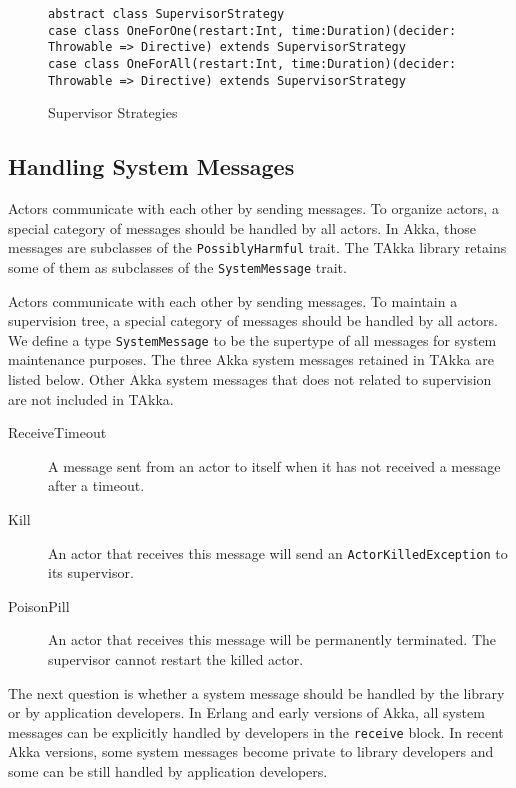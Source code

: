 \begin{figure}
\label{super}
    \begin{lstlisting}    
abstract class SupervisorStrategy
case class OneForOne(restart:Int, time:Duration)(decider: Throwable => Directive) extends SupervisorStrategy
case class OneForAll(restart:Int, time:Duration)(decider: Throwable => Directive) extends SupervisorStrategy
    \end{lstlisting}
    \caption{Supervisor Strategies}
\end{figure}


\subsection{Handling System Messages}
\label{systemmessage}
Actors communicate with each other by sending messages.  To organize actors, a 
special category of messages should be handled by all actors.  In Akka, those 
messages are subclasses of the {\tt PossiblyHarmful} trait.  The TAkka library 
retains some of them as subclasses of the {\tt SystemMessage} trait.

Actors communicate with each other by sending messages.  To maintain a
supervision tree, a special category of messages should be handled by all 
actors.  We define a type {\tt SystemMessage} to be the supertype of all 
messages for system maintenance purposes.  The three Akka system messages 
retained in TAkka are listed below.  Other Akka system messages that does not 
related to supervision are not included in TAkka.


\begin{description}
  \item[ReceiveTimeout] A message sent from an actor to itself when it has not received a message
after a timeout.
  \item[Kill] An actor that receives this message will send an {\tt ActorKilledException} to its supervisor.
  \item[PoisonPill] An actor that receives this message will be 
permanently terminated.  The supervisor cannot restart the killed actor.
\end{description}


The next question is whether a system message should be handled by the library 
or by application developers.  In Erlang and early versions of Akka, all
system messages can be explicitly handled by developers in the {\tt receive}
block.  In recent Akka versions, some system messages become private to library 
developers and some can be still handled by application developers.

